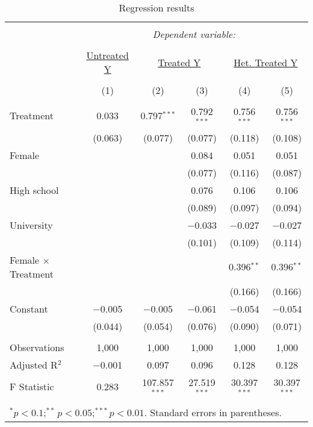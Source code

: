 \documentclass[11pt, a4paper]{article}\usepackage[]{graphicx}\usepackage[]{color}
\begin{document}
\begin{table}[!htbp] \centering 
  \caption{Regression results} 
  \label{} 
\begin{tabular}{@{\extracolsep{5pt}}lccccc} 
\\[-1.8ex]\hline 
\hline \\[-1.8ex] 
 & \multicolumn{5}{c}{\textit{Dependent variable:}} \\ 
\cline{2-6} 
\\[-1.8ex] & \underline{Untreated Y} & \multicolumn{2}{c}{\underline{Treated Y}} & \multicolumn{2}{c}{\underline{Het. Treated Y}} \\ 
\\[-1.8ex] & (1) & (2) & (3) & (4) & (5)\\ 
\hline \\[-1.8ex] 
 Treatment & 0.033 & 0.797$^{***}$ & 0.792$^{***}$ & 0.756$^{***}$ & 0.756$^{***}$ \\ 
  & (0.063) & (0.077) & (0.077) & (0.118) & (0.108) \\ 
  Female &  &  & 0.084 & 0.051 & 0.051 \\ 
  &  &  & (0.077) & (0.116) & (0.087) \\ 
  High school &  &  & 0.076 & 0.106 & 0.106 \\ 
  &  &  & (0.089) & (0.097) & (0.094) \\ 
  University &  &  & $-$0.033 & $-$0.027 & $-$0.027 \\ 
  &  &  & (0.101) & (0.109) & (0.114) \\ 
  Female $\times$ Treatment &  &  &  & 0.396$^{**}$ & 0.396$^{**}$ \\ 
  &  &  &  & (0.166) & (0.166) \\ 
  Constant & $-$0.005 & $-$0.005 & $-$0.061 & $-$0.054 & $-$0.054 \\ 
  & (0.044) & (0.054) & (0.076) & (0.090) & (0.071) \\ 
 \hline \\[-1.8ex] 
Observations & 1,000 & 1,000 & 1,000 & 1,000 & 1,000 \\ 
Adjusted R$^{2}$ & $-$0.001 & 0.097 & 0.096 & 0.128 & 0.128 \\ 
F Statistic & 0.283 & 107.857$^{***}$ & 27.519$^{***}$ & 30.397$^{***}$ & 30.397$^{***}$ \\ 
\hline 
\hline \\[-1.8ex] 
\multicolumn{6}{l}{\parbox[t]{10cm}{$^{*}p<0.1;^{**}p<0.05;^{***}p<0.01$. Standard errors in parentheses.}} \\ 
\end{tabular} 
\end{table} 
\end{document}

